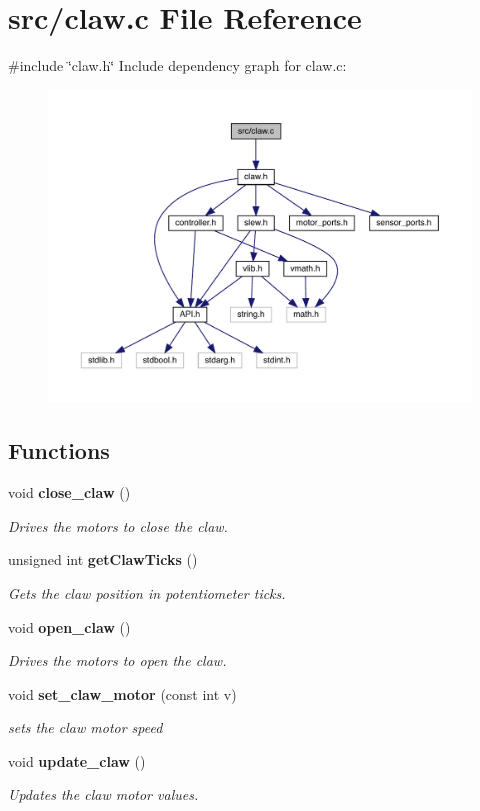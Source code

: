 \section{src/claw.c File Reference}
\label{claw_8c}
{\ttfamily \#include \char`\"{}claw.\+h\char`\"{}}\newline
Include dependency graph for claw.\+c\+:\nopagebreak
\begin{figure}[H]
\begin{center}
\leavevmode
\includegraphics[width=350pt]{claw_8c__incl}
\end{center}
\end{figure}
\subsection*{Functions}
\begin{DoxyCompactItemize}
\item 
void \textbf{ close\+\_\+claw} ()
\begin{DoxyCompactList}\small\item\em Drives the motors to close the claw. \end{DoxyCompactList}\item 
unsigned int \textbf{ get\+Claw\+Ticks} ()
\begin{DoxyCompactList}\small\item\em Gets the claw position in potentiometer ticks. \end{DoxyCompactList}\item 
void \textbf{ open\+\_\+claw} ()
\begin{DoxyCompactList}\small\item\em Drives the motors to open the claw. \end{DoxyCompactList}\item 
void \textbf{ set\+\_\+claw\+\_\+motor} (const int v)
\begin{DoxyCompactList}\small\item\em sets the claw motor speed \end{DoxyCompactList}\item 
void \textbf{ update\+\_\+claw} ()
\begin{DoxyCompactList}\small\item\em Updates the claw motor values. \end{DoxyCompactList}\end{DoxyCompactItemize}


